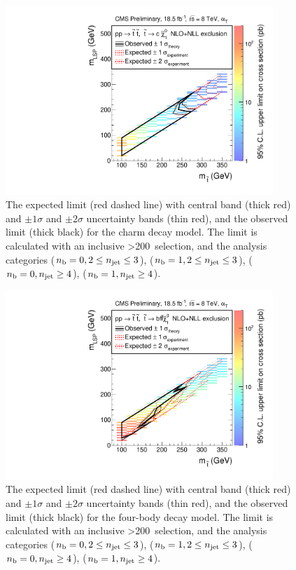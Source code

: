 \begin{figure}[h!]
\centering
\includegraphics[width=0.9\textwidth]{Figs/sms/t2cc/limit_v0/T2cc_toys_XSEC.pdf}
\caption{The expected limit (red dashed line) with central band (thick red)
and $\pm1\sigma$ and $\pm2\sigma$ uncertainty bands (thin red), and the
observed limit (thick black) for the charm decay model. The limit is
calculated with an inclusive \HT>200~\gev selection, and the analysis categories 
($n_{\text{b}} = 0, 2\leq n_{\text{jet}}\leq3$), ($n_{\text{b}} = 1, 2\leq n_{\text{jet}}\leq3$), ($n_{\text{b}} = 0, n_{\text{jet}} \geq 4$), ($n_{\text{b}} = 1,
n_{\text{jet}} \geq 4$).}
\label{fig:t2cc_limit}
\end{figure}

\begin{figure}[h!]
\centering
\includegraphics[width=0.9\textwidth]{Figs/sms/t2degen/limit_v0/T2degen_toys_XSEC.pdf}
\caption{The expected limit (red dashed line) with central band (thick red)
and $\pm1\sigma$ and $\pm2\sigma$ uncertainty bands (thin red), and the
observed limit (thick black) for the four-body decay model. The limit is
calculated with an inclusive \HT>200~\gev selection, and the analysis categories 
($n_{\text{b}} = 0, 2\leq n_{\text{jet}}\leq3$), ($n_{\text{b}} = 1, 2\leq n_{\text{jet}}\leq3$), ($n_{\text{b}} = 0, n_{\text{jet}} \geq 4$), ($n_{\text{b}} = 1,
n_{\text{jet}} \geq 4$).}
\label{fig:t2degen_limit}
\end{figure}


